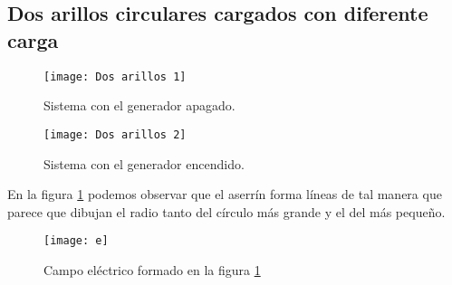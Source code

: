 \documentclass[spanish,10pt,a4paper,final,onecolumn,leqno,fleqn]{article}
\begin{document}
\newpage
\subsection{Dos arillos circulares cargados con diferente carga}

\begin{figure}[h!]
	\centering
	\texttt{[image: Dos arillos 1]}
	\caption{Sistema con el generador apagado.}
\end{figure}

\begin{figure}[h!]
	\centering
	\texttt{[image: Dos arillos 2]}
	\caption{Sistema con el generador encendido.}
	\label{fig:DosArillos}
\end{figure}

En la figura \ref{fig:DosArillos} podemos observar que el aserrín forma líneas de tal manera que parece que dibujan el radio tanto del círculo más grande y el del más pequeño.

\begin{figure}[h!]
	\centering
	\texttt{[image: e]}
	\caption{Campo eléctrico formado en la figura \ref{fig:DosArillos}}
\end{figure}
\end{document}
